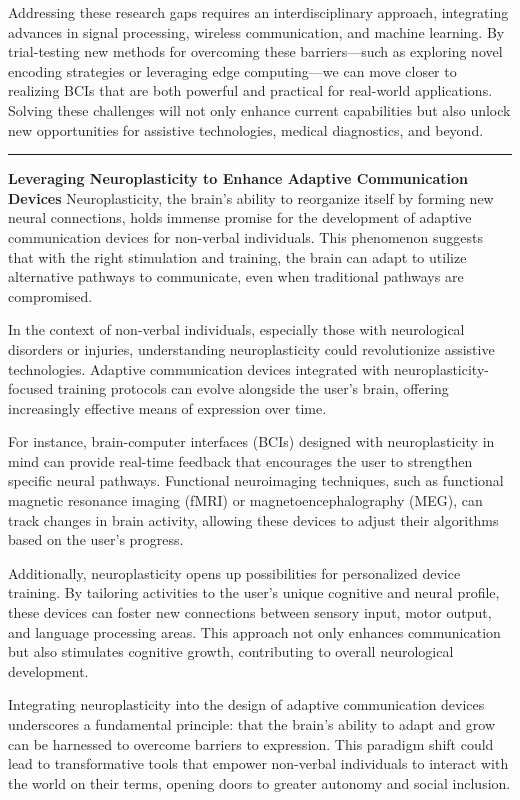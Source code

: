 \documentclass[12pt, research paper]{report}
\begin{document}
	\noindent Addressing these research gaps requires an interdisciplinary approach, integrating advances in signal processing, wireless communication, and machine learning. By trial-testing new methods for overcoming these barriers—such as exploring novel encoding strategies or leveraging edge computing—we can move closer to realizing BCIs that are both powerful and practical for real-world applications. Solving these challenges will not only enhance current capabilities but also unlock new opportunities for assistive technologies, medical diagnostics, and beyond.
	
	\noindent \rule{13.85cm}{0.01cm}
	\textbf{Leveraging Neuroplasticity to Enhance Adaptive Communication Devices}
	\newline Neuroplasticity, the brain's ability to reorganize itself by forming new neural connections, holds immense promise for the development of adaptive communication devices for non-verbal individuals. This phenomenon suggests that with the right stimulation and training, the brain can adapt to utilize alternative pathways to communicate, even when traditional pathways are compromised.
	\bigskip 
	
	\noindent In the context of non-verbal individuals, especially those with neurological disorders or injuries, understanding neuroplasticity could revolutionize assistive technologies. Adaptive communication devices integrated with neuroplasticity-focused training protocols can evolve alongside the user's brain, offering increasingly effective means of expression over time.
	\bigskip 
	
	\noindent For instance, brain-computer interfaces (BCIs) designed with neuroplasticity in mind can provide real-time feedback that encourages the user to strengthen specific neural pathways. Functional neuroimaging techniques, such as functional magnetic resonance imaging (fMRI) or magnetoencephalography (MEG), can track changes in brain activity, allowing these devices to adjust their algorithms based on the user's progress.
	\bigskip 
	
	\noindent Additionally, neuroplasticity opens up possibilities for personalized device training. By tailoring activities to the user's unique cognitive and neural profile, these devices can foster new connections between sensory input, motor output, and language processing areas. This approach not only enhances communication but also stimulates cognitive growth, contributing to overall neurological development.
	\bigskip 
	
	\noindent Integrating neuroplasticity into the design of adaptive communication devices underscores a fundamental principle: that the brain's ability to adapt and grow can be harnessed to overcome barriers to expression. This paradigm shift could lead to transformative tools that empower non-verbal individuals to interact with the world on their terms, opening doors to greater autonomy and social inclusion.
	
\end{document}
